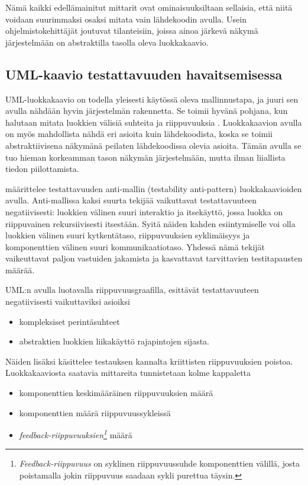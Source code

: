 \documentclass[finnish]{tktltiki2}
\theoremstyle{definition}
\theoremstyle{remark}
\begin{document}
Nämä kaikki edellämainitut mittarit ovat ominaisuuksiltaan sellaisia, että niitä voidaan suurimmaksi osaksi mitata vain lähdekoodin avulla. Usein ohjelmistokehittäjät joutuvat tilanteisiin, joissa ainoa järkevä näkymä järjestelmään on abstraktilla tasolla oleva luokkakaavio.

\subsection{UML-kaavio testattavuuden havaitsemisessa}

UML-luokkakaavio on todella yleisesti käytössä oleva mallinnustapa, ja juuri sen avulla nähdään hyvin järjestelmän rakennetta. Se toimii hyvänä pohjana, kun halutaan mitata luokkien välisiä suhteita ja riippuvuuksia \citep{baudry_testability_2002}. Luokkakaavion avulla on myös mahdollista nähdä eri asioita kuin lähdekoodista, koska se toimii abstraktiivisena näkymänä peilaten lähdekoodissa olevia asioita. Tämän avulla se tuo hieman korkeamman tason näkymän järjestelmään, mutta ilman liiallista tiedon piilottamista. 

\citep[s. 3]{baudry_measuring_2003} määrittelee testattavuuden anti-mallin (testability anti-pattern) luokkakaavioiden avulla. Anti-mallissa kaksi suurta tekijää vaikuttavat testattavuuteen negatiivisesti: luokkien välinen suuri interaktio ja itsekäyttö, jossa luokka on riippuvainen rekursiivisesti itsestään. Syitä näiden kahden esiintymiselle voi olla luokkien välinen suuri kytkentätaso, riippuvuuksien syklimäisyys ja komponenttien välinen suuri kommunikaatiotaso. Yhdessä nämä tekijät vaikeuttavat paljon vastuiden jakamista ja kasvattavat tarvittavien testitapausten määrää. 


UML:n avulla luotavalla riippuvuusgraafilla, esittävät testattavuuteen negatiivisesti vaikuttaviksi asioiksi \citep{baudry_testability_2002}

\begin{itemize} 
	\item kompleksiset perintäsuhteet
	\item abstraktien luokkien liikakäyttö rajapintojen sijasta.
\end{itemize}


Näiden lisäksi \citep{Jungmayr:2002} käsittelee testauksen kannalta kriittisten riippuvuuksien poistoa. Luokkakaaviosta saatavia mittareita tunnistetaan kolme kappaletta 

\begin{itemize}
	\item komponenttien keskimääräinen riippuvuuksien määrä
	\item komponenttien määrä riippuvuussykleissä
	\item \textit{feedback-riippuvuuksien\footnote{\textit{Feedback-riippuvuus} on syklinen riippuvuussuhde komponenttien välillä, josta poistamalla jokin riippuvuus saadaan sykli purettua täysin.}}  määrä 
\end{itemize}
\end{document}
